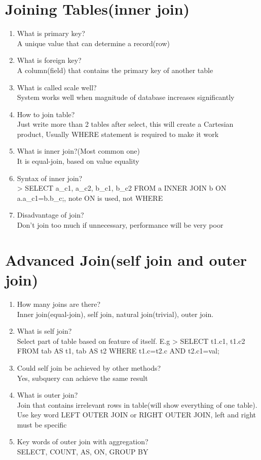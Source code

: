 \documentclass[10pt,a4paper,oneside]{article}
\begin{document}
\section{Joining Tables(inner join)}
\begin{enumerate}[1.]
\item  What is primary key?  \\
A unique value that can determine a record(row)
\item  What is foreign key?  \\
A column(field) that contains the primary key of another table
\item  What is called scale well?  \\
System works well when magnitude of database increases significantly 
\item  How to join table?  \\
Just write more than 2 tables after select, this will create a Cartesian product, Usually WHERE statement is required to make it work
\item  What is inner join?(Most common one)  \\
It is equal-join, based on value equality 
\item   Syntax of inner join? \\
> SELECT a\_c1, a\_c2, b\_c1, b\_c2 FROM a INNER JOIN b ON a.a\_c1=b.b\_c;, note ON is used, not WHERE
\item Disadvantage of join?   \\
Don’t join too much if unnecessary, performance will be very poor
\end{enumerate}
\section{Advanced Join(self join and outer join)}
\begin{enumerate}[1.]
\item  How many joins are there?   \\
Inner join(equal-join), self join, natural join(trivial), outer join. 
\item   What is self join?  \\
Select part of table based on feature of itself. E.g > SELECT t1.c1, t1.c2 FROM tab AS t1,  tab AS t2 WHERE t1.c=t2.c AND t2.c1=val;
\item   Could self join be achieved by other methods?  \\
Yes, subquery can achieve the same result
\item   What is outer join?  \\
Join that contains irrelevant rows in table(will show everything of one table). Use key word LEFT OUTER JOIN or RIGHT OUTER JOIN, left and right must be specific
\item   Key words of outer join with aggregation?  \\
SELECT, COUNT, AS, ON, GROUP BY 
\end{enumerate}
\end{document}

